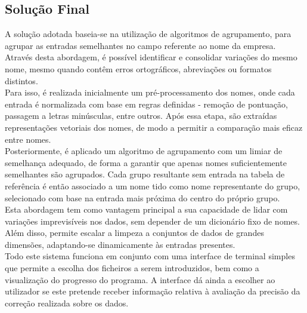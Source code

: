 \documentclass[a4paper,12pt]{article}
\begin{document}





\subsection{Solução Final}

A solução adotada baseia-se na utilização de algoritmos de agrupamento, para agrupar as entradas semelhantes no campo referente ao nome da empresa. Através desta abordagem, é possível identificar e consolidar variações do mesmo nome, mesmo quando contêm erros ortográficos, abreviações ou formatos distintos.
\\
Para isso, é realizada inicialmente um pré-processamento dos nomes, onde cada entrada é normalizada com base em regras definidas - remoção de pontuação, passagem a letras minúsculas, entre outros. Após essa etapa, são extraídas representações vetoriais dos nomes, de modo a permitir a comparação mais eficaz entre nomes.
\\
Posteriormente, é aplicado um algoritmo de agrupamento com um limiar de semelhança adequado, de forma a garantir que apenas nomes suficientemente semelhantes são agrupados. Cada grupo resultante sem entrada na tabela de referência é então associado a um nome tido como nome representante do grupo, selecionado com base na entrada mais próxima do centro do próprio grupo.
\\
Esta abordagem tem como vantagem principal a sua capacidade de lidar com variações imprevisíveis nos dados, sem depender de um dicionário fixo de nomes. Além disso, permite escalar a limpeza a conjuntos de dados de grandes dimensões, adaptando-se dinamicamente às entradas presentes.
\\
Todo este sistema funciona em conjunto com uma interface de terminal simples que permite a escolha dos ficheiros a serem introduzidos, bem como a visualização do progresso do programa. A interface dá ainda a escolher ao utilizador se este pretende receber informação relativa à avaliação da precisão da correção realizada sobre os dados.
\end{document}
